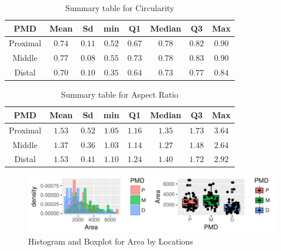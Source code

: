 \documentclass{article}\usepackage[]{graphicx}\usepackage[]{color}
\makeatletter
\def\maxwidth{ %
  \ifdim\Gin@nat@width>\linewidth
    \linewidth
  \else
    \Gin@nat@width
  \fi
}
\newenvironment{knitrout}{}{} %
\numberwithin{figure}{subsection} %
\numberwithin{table}{subsection} %
\makeatother
\begin{document}
\begin{table}[!htbp]
{\footnotesize
\begin{center}
\begin{tabular}{cccccccc}
\hline\hline
\multicolumn{1}{c}{PMD}&\multicolumn{1}{c}{Mean}&\multicolumn{1}{c}{Sd}&\multicolumn{1}{c}{min}&\multicolumn{1}{c}{Q1}&\multicolumn{1}{c}{Median}&\multicolumn{1}{c}{Q3}&\multicolumn{1}{c}{Max}\tabularnewline
\hline
Proximal&$0.74$&$0.11$&$0.52$&$0.67$&$0.78$&$0.82$&$0.90$\tabularnewline
Middle&$0.77$&$0.08$&$0.55$&$0.73$&$0.78$&$0.83$&$0.90$\tabularnewline
Distal&$0.70$&$0.10$&$0.35$&$0.64$&$0.73$&$0.77$&$0.84$\tabularnewline
\hline
\end{tabular}
\caption{Summary table for Circularity\label{tab_cir_pmd}}\end{center}}
\end{table}

 \vspace{0.5cm}

\begin{table}[!htbp]
{\footnotesize
\begin{center}
\begin{tabular}{cccccccc}
\hline\hline
\multicolumn{1}{c}{PMD}&\multicolumn{1}{c}{Mean}&\multicolumn{1}{c}{Sd}&\multicolumn{1}{c}{min}&\multicolumn{1}{c}{Q1}&\multicolumn{1}{c}{Median}&\multicolumn{1}{c}{Q3}&\multicolumn{1}{c}{Max}\tabularnewline
\hline
Proximal&$1.53$&$0.52$&$1.05$&$1.16$&$1.35$&$1.73$&$3.64$\tabularnewline
Middle&$1.37$&$0.36$&$1.03$&$1.14$&$1.27$&$1.48$&$2.64$\tabularnewline
Distal&$1.53$&$0.41$&$1.10$&$1.24$&$1.40$&$1.72$&$2.92$\tabularnewline
\hline
\end{tabular}
\caption{Summary table for Aspect Ratio\label{tab_ar_pmd}}\end{center}}
\end{table}


\newpage
\begin{figure}[!htbp]
  \centering
\begin{knitrout}
\color{fgcolor}
\includegraphics[width=\maxwidth]{figure/unnamed-chunk-5-1} 

\end{knitrout}
  \caption{Histogram and Boxplot for Area by Locations}
  \label{fig_area_pmd}
\end{figure}
\vspace{0.5cm}
\end{document}
